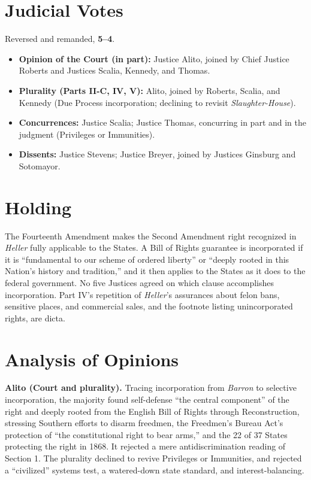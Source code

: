 \documentclass[12pt]{article}
\begin{document}
\section{Judicial Votes}

Reversed and remanded, \textbf{5--4}.
\begin{itemize}
\item \textbf{Opinion of the Court (in part):} Justice Alito, joined by Chief Justice Roberts and Justices Scalia, Kennedy, and Thomas.
\item \textbf{Plurality (Parts II-C, IV, V):} Alito, joined by Roberts, Scalia, and Kennedy (Due Process incorporation; declining to revisit \textit{Slaughter-House}).
\item \textbf{Concurrences:} Justice Scalia; Justice Thomas, concurring in part and in the judgment (Privileges or Immunities).
\item \textbf{Dissents:} Justice Stevens; Justice Breyer, joined by Justices Ginsburg and Sotomayor.
\end{itemize}

\section{Holding}

The Fourteenth Amendment makes the Second Amendment right recognized in \textit{Heller} fully applicable to the States. A Bill of Rights guarantee is incorporated if it is ``fundamental to our scheme of ordered liberty'' or ``deeply rooted in this Nation's history and tradition,'' and it then applies to the States as it does to the federal government. No five Justices agreed on which clause accomplishes incorporation. Part IV's repetition of \textit{Heller}'s assurances about felon bans, sensitive places, and commercial sales, and the footnote listing unincorporated rights, are dicta.

\section{Analysis of Opinions}

\textbf{Alito (Court and plurality).} Tracing incorporation from \textit{Barron} to selective incorporation, the majority found self-defense ``the central component'' of the right and deeply rooted from the English Bill of Rights through Reconstruction, stressing Southern efforts to disarm freedmen, the Freedmen's Bureau Act's protection of ``the constitutional right to bear arms,'' and the 22 of 37 States protecting the right in 1868. It rejected a mere antidiscrimination reading of Section 1. The plurality declined to revive Privileges or Immunities, and rejected a ``civilized'' systems test, a watered-down state standard, and interest-balancing.
\end{document}
